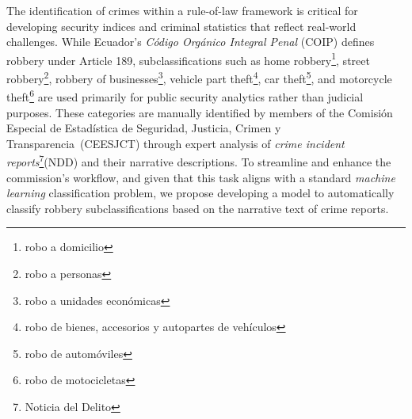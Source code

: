 \documentclass[onecolumn, journal, english, 12pt, a4paper]{IEEEtran} %
\newcommand{\printnombrecomision}{Comisión Especial de Estadística de
  Seguridad, Justicia, Crimen y Transparencia}
\theoremstyle{definition}
\begin{document}
The identification of crimes within a rule-of-law framework is
critical for developing security indices and criminal statistics that
reflect real-world challenges. While Ecuador’s \emph{Código Orgánico
  Integral Penal} (COIP) defines robbery under Article 189,
subclassifications such as home robbery\footnote{robo a domicilio},
street robbery\footnote{robo a personas}, robbery of
businesses\footnote{robo a unidades económicas}, vehicle part
theft\footnote{robo de bienes, accesorios y autopartes de vehículos},
car theft\footnote{robo de automóviles}, and motorcycle
theft\footnote{robo de motocicletas} are used primarily for public
security analytics rather than judicial purposes. These categories are
manually identified by members of the \printnombrecomision\ (CEESJCT)
through expert analysis of \textit{crime incident
  reports}\footnote{Noticia del Delito}(NDD) and their narrative
descriptions. To streamline and enhance the commission’s workflow, and
given that this task aligns with a standard \emph{machine learning}
classification problem, we propose developing a model to automatically
classify robbery subclassifications based on the narrative text of
crime reports.
\end{document}
